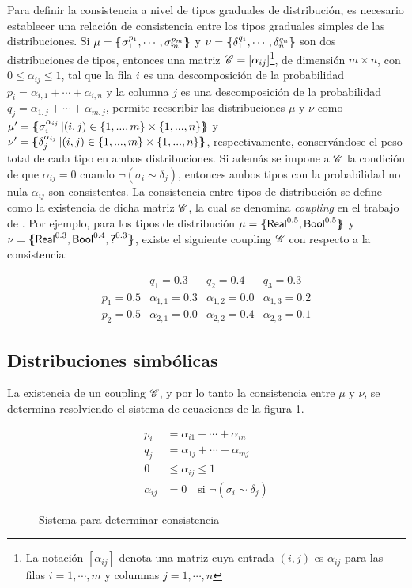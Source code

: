 Para definir la consistencia a nivel de tipos graduales de distribución,
es necesario establecer una relación de consistencia entre los tipos
graduales simples de las distribuciones. Si
$\mu = \{\mskip-7mu\{ {\sigma_1^{p_1},\cdots,\sigma_m^{p_m}} \}\mskip-7mu\}$ y
$\nu = \{\mskip-7mu\{ {\delta_1^{q_1},\cdots,\delta_n^{q_n}} \}\mskip-7mu\}$ son dos
distribuciones de tipos, entonces una matriz
$\mathscr{C} = [\alpha_{ij}]$\footnote{La notación
  $[\alpha_{ij}]$ denota una matriz cuya entrada $(i,j)$ es
  $\alpha_{ij}$ para las filas $i=1,\cdots,m$ y columnas
  $j=1,\cdots,n$}, de dimensión $m\times n$, con
$0\leq\alpha_{ij}\leq 1$, tal que la fila $i$ es una descomposición de
la probabilidad $p_i = \alpha_{i,1}+\cdots +\alpha_{i,n}$ y la columna
$j$ es una descomposición de la probabilidad
$q_j = \alpha_{1,j} + \cdots +\alpha_{m,j}$, permite reescribir las
distribuciones $\mu$ y $\nu$ como
$\mu'= \{\mskip-7mu\{ { \sigma_i^{\alpha_{ij}} \mathop{|}
  (i,j)\in\{1,...,m\}\times\{1,...,n\} } \}\mskip-7mu\}$ y
$\nu'= \{\mskip-7mu\{ { \delta_j^{\alpha_{ij}} \mathop{|}
  (i,j)\in\{1,...,m\}\times\{1,...,n\} } \}\mskip-7mu\}$, respectivamente,
conservándose el peso total de cada tipo en ambas distribuciones. Si
además se impone a $\mathscr{C}$ la condición de que $\alpha_{ij} = 0$
cuando $\neg(\sigma_i\sim \delta_j)$, entonces ambos tipos con la
probabilidad no nula $\alpha_{ij}$ son consistentes. La consistencia
entre tipos de distribución se define como la existencia de dicha
matriz $\mathscr{C}$, la cual se denomina \emph{coupling} en el trabajo
de \cite{gplc}. Por ejemplo, para los tipos de distribución
$\mu=\{\mskip-7mu\{ {\mathord{\text{\sffamily Real}}^{0.5}, \mathord{\text{\sffamily Bool}}^{0.5}} \}\mskip-7mu\}$ y
$\nu=\{\mskip-7mu\{ {\mathord{\text{\sffamily Real}}^{0.3},\mathord{\text{\sffamily Bool}}^{0.4},\mathord{\text{\sffamily ?}}^{0.3}} \}\mskip-7mu\}$, existe el siguiente
coupling $\mathscr{C}$ con respecto a la consistencia:

\[
  \begin{array}{c|cccc}
    
    \phantom{e} & q_{1} = 0.3 & q_{2} = 0.4 & q_{3} = 0.3\\
    \hline
     p_{1} = 0.5 & \alpha_{1,1} = 0.3 & \alpha_{1,2} = 0.0 & \alpha_{1,3} = 0.2 \\
    p_{2} = 0.5 & \alpha_{2,1} = 0.0 & \alpha_{2,2} = 0.4 & \alpha_{2,3}  = 0.1
  \end{array}
\]


\subsection{Distribuciones simbólicas}\label{par:symbolic} La existencia de un coupling $\mathscr{C}$, y por lo tanto la consistencia entre $\mu$ y $\nu$, se determina resolviendo el sistema de ecuaciones de la figura \ref{fig:coupling-eq}.
\begin{figure}[H]
\centering
\begin{align*}
  p_i &= \alpha_{i1}+\cdots+\alpha_{in}\\
  q_j &= \alpha_{1j}+\cdots+\alpha_{mj}\\
  0 &\le \alpha_{ij} \le 1\\
  \alpha_{ij} &= 0 \quad \text{si } \neg(\sigma_i \sim \delta_j)
\end{align*}
\caption{Sistema para determinar consistencia}
\label{fig:coupling-eq}
\end{figure}


